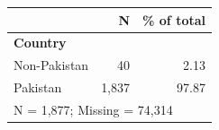 \begin{tabular}{lrr}


\toprule


 & N & \% of total \\


\midrule


\multicolumn{3}{l}{\textbf{Country}}\\ 
\midrule
Non-Pakistan        &          40&        2.13\\
Pakistan            &       1,837&       97.87\\
\midrule


\multicolumn{3}{l}{\footnotesize N =        1,877; Missing =       74,314}\\


\bottomrule


\end{tabular}



